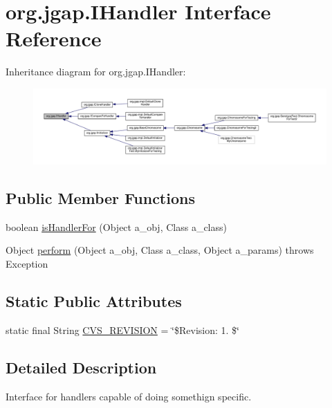 \hypertarget{interfaceorg_1_1jgap_1_1_i_handler}{\section{org.\-jgap.\-I\-Handler Interface Reference}
\label{interfaceorg_1_1jgap_1_1_i_handler}
}


Inheritance diagram for org.\-jgap.\-I\-Handler\-:
\nopagebreak
\begin{figure}[H]
\begin{center}
\leavevmode
\includegraphics[width=350pt]{interfaceorg_1_1jgap_1_1_i_handler__inherit__graph}
\end{center}
\end{figure}
\subsection*{Public Member Functions}
\begin{DoxyCompactItemize}
\item 
boolean \hyperlink{interfaceorg_1_1jgap_1_1_i_handler_a026d7a41944049a4f812ee0d1151d40e}{is\-Handler\-For} (Object a\-\_\-obj, Class a\-\_\-class)
\item 
Object \hyperlink{interfaceorg_1_1jgap_1_1_i_handler_a60199862000df04a4b2491d6d08f2f2c}{perform} (Object a\-\_\-obj, Class a\-\_\-class, Object a\-\_\-params)  throws Exception
\end{DoxyCompactItemize}
\subsection*{Static Public Attributes}
\begin{DoxyCompactItemize}
\item 
static final String \hyperlink{interfaceorg_1_1jgap_1_1_i_handler_ac87eeb82b5fb4d6e5ba1f8850db52118}{C\-V\-S\-\_\-\-R\-E\-V\-I\-S\-I\-O\-N} = \char`\"{}\$Revision\-: 1. \$\char`\"{}
\end{DoxyCompactItemize}


\subsection{Detailed Description}
Interface for handlers capable of doing somethign specific.

